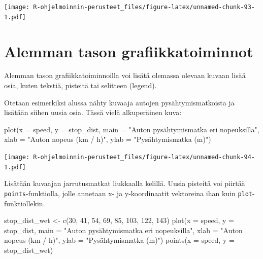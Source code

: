 \documentclass[
]{book}
\newenvironment{Shaded}{\begin{snugshade}}{\end{snugshade}}
\newcommand{\AttributeTok}[1]{\textcolor[rgb]{0.77,0.63,0.00}{#1}}
\newcommand{\DecValTok}[1]{\textcolor[rgb]{0.00,0.00,0.81}{#1}}
\newcommand{\FunctionTok}[1]{\textcolor[rgb]{0.00,0.00,0.00}{#1}}
\newcommand{\NormalTok}[1]{#1}
\newcommand{\OtherTok}[1]{\textcolor[rgb]{0.56,0.35,0.01}{#1}}
\newcommand{\StringTok}[1]{\textcolor[rgb]{0.31,0.60,0.02}{#1}}
\begin{document}
\texttt{[image: R-ohjelmoinnin-perusteet\_files/figure-latex/unnamed-chunk-93-1.pdf]}

\hypertarget{alemman-tason-grafiikkatoiminnot}{%
\section{Alemman tason grafiikkatoiminnot}\label{alemman-tason-grafiikkatoiminnot}}

Alemman tason grafiikkatoiminnoilla voi lisätä olemassa olevaan kuvaan lisää osia, kuten tekstiä, pisteitä tai selitteen (legend).

Otetaan esimerkiksi alussa nähty kuvaaja autojen pysähtymismatkoista ja lisätään siihen uusia osia. Tässä vielä alkuperäinen kuva:

\begin{Shaded}
\begin{Highlighting}[]
\FunctionTok{plot}\NormalTok{(}\AttributeTok{x =}\NormalTok{ speed, }\AttributeTok{y =}\NormalTok{ stop\_dist,}
     \AttributeTok{main =} \StringTok{"Auton pysähtymismatka eri nopeuksilla"}\NormalTok{,}
     \AttributeTok{xlab =} \StringTok{"Auton nopeus (km / h)"}\NormalTok{, }\AttributeTok{ylab =} \StringTok{"Pysähtymismatka (m)"}\NormalTok{)}
\end{Highlighting}
\end{Shaded}

\texttt{[image: R-ohjelmoinnin-perusteet\_files/figure-latex/unnamed-chunk-94-1.pdf]}

Lisätään kuvaajan jarrutusmatkat liukkaalla kelillä. Uusia pisteitä voi piirtää \texttt{points}-funktiolla, jolle annetaan x- ja y-koordinaatit vektoreina ihan kuin \texttt{plot}-funktiollekin.

\begin{Shaded}
\begin{Highlighting}[]
\NormalTok{stop\_dist\_wet }\OtherTok{\textless{}{-}} \FunctionTok{c}\NormalTok{(}\DecValTok{30}\NormalTok{, }\DecValTok{41}\NormalTok{, }\DecValTok{54}\NormalTok{, }\DecValTok{69}\NormalTok{, }\DecValTok{85}\NormalTok{, }\DecValTok{103}\NormalTok{, }\DecValTok{122}\NormalTok{, }\DecValTok{143}\NormalTok{)}
\FunctionTok{plot}\NormalTok{(}\AttributeTok{x =}\NormalTok{ speed, }\AttributeTok{y =}\NormalTok{ stop\_dist,}
     \AttributeTok{main =} \StringTok{"Auton pysähtymismatka eri nopeuksilla"}\NormalTok{,}
     \AttributeTok{xlab =} \StringTok{"Auton nopeus (km / h)"}\NormalTok{, }\AttributeTok{ylab =} \StringTok{"Pysähtymismatka (m)"}\NormalTok{)}
\FunctionTok{points}\NormalTok{(}\AttributeTok{x =}\NormalTok{ speed, }\AttributeTok{y =}\NormalTok{ stop\_dist\_wet)}
\end{Highlighting}
\end{Shaded}
\end{document}
